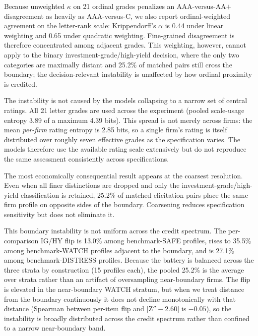 \documentclass[a4paper,fleqn]{cas-sc}
\begin{document}
Because unweighted $\kappa$ on 21 ordinal grades penalizes an AAA-versus-AA$+$ disagreement as heavily
as AAA-versus-C, we also report ordinal-weighted agreement on the letter-rank scale: Krippendorff's
$\alpha$ is 0.44 under linear weighting and 0.65 under quadratic weighting. Fine-grained disagreement is
therefore concentrated among adjacent grades. This weighting, however, cannot apply to the binary
investment-grade/high-yield decision, where the only two categories are maximally distant and 25.2\% of
matched pairs still cross the boundary; the decision-relevant instability is unaffected by how ordinal
proximity is credited.

The instability is not caused by the models collapsing to a narrow set of central ratings. All 21 letter
grades are used across the experiment (pooled scale-usage entropy 3.89 of a maximum 4.39 bits). This
spread is not merely across firms: the mean \emph{per-firm} rating entropy is 2.85 bits, so a single
firm's rating is itself distributed over roughly seven effective grades as the specification varies. The
models therefore use the available rating scale extensively but do not reproduce the same assessment
consistently across specifications.

The most economically consequential result appears at the coarsest resolution. Even when all finer
distinctions are dropped and only the investment-grade/high-yield classification is retained, 25.2\% of
matched elicitation pairs place the same firm profile on opposite sides of the boundary. Coarsening
reduces specification sensitivity but does not eliminate it.

This boundary instability is not uniform across the credit spectrum. The per-comparison IG/HY flip is 13.0\% among benchmark-SAFE profiles, rises to
35.5\% among benchmark-WATCH profiles adjacent to the boundary, and is 27.1\% among benchmark-DISTRESS
profiles. Because the battery is balanced across the three strata by construction (15 profiles each), the
pooled 25.2\% is the average over strata rather than an artifact of oversampling near-boundary firms.
The flip is elevated in the near-boundary WATCH stratum, but when we treat distance from the boundary
continuously it does not decline monotonically with that distance (Spearman between per-item flip and
$|$Z$''-2.60|$ is $-0.05$), so the instability is broadly distributed across the credit spectrum rather
than confined to a narrow near-boundary band.
\end{document}

